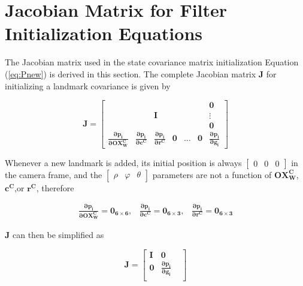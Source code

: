 \chapter{Jacobian Matrix for Filter Initialization Equations}\label{ch:appendix2}
The Jacobian matrix used in the state covariance matrix initialization
Equation (\ref{eq:Pnew}) is derived in this section. The complete
Jacobian matrix $\boldsymbol{J}$ for initializing a landmark
covariance is given by

\begin{equation}
\boldsymbol{J}=\begin{bmatrix}
 & & & & & &\boldsymbol{0}\\
 & &\boldsymbol{I}& & & &\vdots\\ 
 & & & & & &\boldsymbol{0}\\
\boldsymbol{\frac{\partial p_{i}}{\partial OX_{W}^{C}}} &
\boldsymbol{\frac{\partial p_{i}}{\partial c^{C}}} & 
\boldsymbol{\frac{\partial p_{i}}{\partial r^{C}}} & 
\boldsymbol{0} & \ldots & \boldsymbol{0} & 
\boldsymbol{\frac{\partial p_{i}}{\partial g_{i}}}
\end{bmatrix}
\end{equation}

\noindent Whenever a new landmark is added, its initial position is
always $[\begin{matrix}0&0&0\end{matrix}]$ in the camera frame, and
the $[\begin{matrix}\rho&\varphi&\theta\end{matrix}]$ parameters are
not a function of $ \boldsymbol{OX_{W}^{C}}$, $\boldsymbol{c^{C}}$,or
$\boldsymbol{r^{C}}$, therefore

\begin{equation}
\begin{matrix}
\boldsymbol{\frac{\partial p_{i}}{\partial OX_{W}^{C}}}=\boldsymbol{0_{6\times 6}}, & 
\boldsymbol{\frac{\partial p_{i}}{\partial c^{C}}}=\boldsymbol{0_{6\times 3}}, &
\boldsymbol{\frac{\partial p_{i}}{\partial r^{C}}}= \boldsymbol{0_{6\times 3}}
\end{matrix}
\end{equation}

\noindent $\boldsymbol{J}$ can then be simplified as

\begin{equation}
\boldsymbol{J}=\begin{bmatrix}
\boldsymbol{I} & \boldsymbol{0} & \\
\boldsymbol{0} & \boldsymbol{\frac{\partial p_{i}}{\partial g_{i}}} & \\
\end{bmatrix} 
\end{equation}


